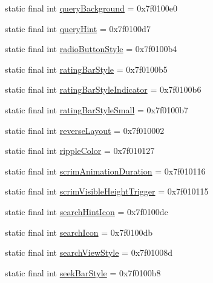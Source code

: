 \begin{CompactItemize}
\item 
static final int \hyperlink{classandroid_1_1support_1_1transition_1_1_r_1_1attr_6ce220342bda6f1db008fcbb7636cb46}{queryBackground} = 0x7f0100e0
\item 
static final int \hyperlink{classandroid_1_1support_1_1transition_1_1_r_1_1attr_6bd0488644338cc8ed6e8661766f53a4}{queryHint} = 0x7f0100d7
\item 
static final int \hyperlink{classandroid_1_1support_1_1transition_1_1_r_1_1attr_42c5aba4122d8f953b6e723987cc7eac}{radioButtonStyle} = 0x7f0100b4
\item 
static final int \hyperlink{classandroid_1_1support_1_1transition_1_1_r_1_1attr_7170f3c63e176db2ccf9f5f8b10f4c10}{ratingBarStyle} = 0x7f0100b5
\item 
static final int \hyperlink{classandroid_1_1support_1_1transition_1_1_r_1_1attr_cbb2aab9423ad494ca0806d215dfb47d}{ratingBarStyleIndicator} = 0x7f0100b6
\item 
static final int \hyperlink{classandroid_1_1support_1_1transition_1_1_r_1_1attr_8df42a1c8f7767a10b2dccf21d188d8e}{ratingBarStyleSmall} = 0x7f0100b7
\item 
static final int \hyperlink{classandroid_1_1support_1_1transition_1_1_r_1_1attr_0c423e7834c234e91afdfbad03843482}{reverseLayout} = 0x7f010002
\item 
static final int \hyperlink{classandroid_1_1support_1_1transition_1_1_r_1_1attr_ca51c8b68799ba98e06641f20f7a3a78}{rippleColor} = 0x7f010127
\item 
static final int \hyperlink{classandroid_1_1support_1_1transition_1_1_r_1_1attr_a44f2adb01cc1ecc7b9d0567160fa0d5}{scrimAnimationDuration} = 0x7f010116
\item 
static final int \hyperlink{classandroid_1_1support_1_1transition_1_1_r_1_1attr_f7ff89a47cf065c872604cdf6a9fe095}{scrimVisibleHeightTrigger} = 0x7f010115
\item 
static final int \hyperlink{classandroid_1_1support_1_1transition_1_1_r_1_1attr_047c68bf93201659985f5275eeb083b2}{searchHintIcon} = 0x7f0100dc
\item 
static final int \hyperlink{classandroid_1_1support_1_1transition_1_1_r_1_1attr_df492fb899b7ae42029c61d57f0795f6}{searchIcon} = 0x7f0100db
\item 
static final int \hyperlink{classandroid_1_1support_1_1transition_1_1_r_1_1attr_2e4dd6b363c18bc74da4b0b9a6e9fe33}{searchViewStyle} = 0x7f01008d
\item 
static final int \hyperlink{classandroid_1_1support_1_1transition_1_1_r_1_1attr_0df4d41e8186df69870e5b593309902e}{seekBarStyle} = 0x7f0100b8

\end{CompactItemize}
